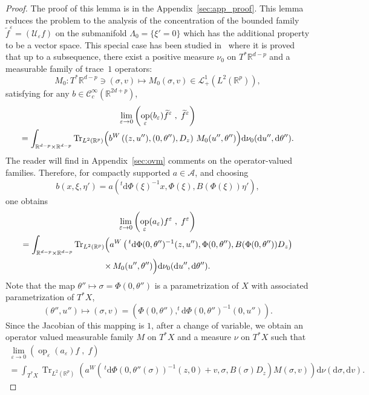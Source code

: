 \documentclass[AHL,Unicode,longabstracts]{cedram}
\DeclareMathOperator{\Trr}{Tr}
\DeclareMathOperator{\op}{op}
\newcommand*\R{{\mathbb R}}
\newcommand*\eps{\varepsilon}
\numberwithin{equation}{section}
\newcommand*{\dd}{\mathrm{d}}
\newcommand*{\dv}{\dd v}
\newcommand*{\du}{\dd u}
\newcommand*{\dnu}{\dd \nu}
\newcommand*{\dtheta}{\dd \theta}
\newcommand*{\dsigma}{\dd \sigma}
\newcommand*{\dPhi}{\dd \Phi} %
\begin{document}
\begin{proof}
The proof of this lemma is in the Appendix~\ref{sec:app_proof}. This lemma reduces the problem to the analysis of the concentration of the bounded family $\widetilde f^\eps =({\mathcal U}_\eps f)$ on the submanifold $\Lambda_0=\{\xi'=0\}$ which has the additional property to be a vector space. This special case has been studied in~\cite[p.~96--97, Proposition~2]{CFMProc} where it is proved that up to a subsequence, there exist a positive measure $\nu_0$ on $T^*\R^{d-p}$ and a measurable family of trace~$1$ operators:
\[
M_0:T^*\R^{d-p}\ni(\sigma,v)\longmapsto M_0(\sigma,v)\in \mathcal{L}^1_+(L^2(\R^p)),
\]
satisfying for any $b\in{\mathcal C}_c^\infty(\R^{2d+p})$,
\begin{multline*}	
 \lim_{\eps\rightarrow 0} \left(\op_\eps(b_\eps)\widetilde f^\eps\;,\;\widetilde f^\eps\right)
\\=\int_{\R^{d-p}\times\R^{d-p}} {\Trr}_{L^2(\R^p)} \Bigl(b^W\left((z,u''),(0,\theta''), D_z\right)
\, M_0(u'',\theta'')\Bigr)\dnu_0(\du'',\dtheta'').
\end{multline*}
The reader will find in Appendix~\ref{sec:ovm} comments on the operator-valued families. Therefore, for compactly supported $a\in{\mathcal A}$, and choosing
\[
b(x,\xi,\eta')= a\left(^t \dPhi (\xi)^{-1} x,\Phi(\xi),B\left(\Phi(\xi)\right)\eta'\right),
\]
one obtains
\begin{multline*}
\lim_{\eps\rightarrow 0} \left(\op_\eps(a_\eps)f^\eps\;,\;f^\eps\right)\\
=\int_{\R^{d-p}\times\R^{d-p}} {\Trr}_{L^2(\R^p)} \Bigl(a^W\left(\,^t \dPhi (0,\theta'')^{-1}(z,u''), \Phi(0,\theta''),B(\Phi(0,\theta'')) D_z\right)
\\ \times\, M_0(u'',\theta'')\Bigr)\dnu_0(\du'',\dtheta'').
\end{multline*}
Note that the map $\theta''\mapsto \sigma =\Phi(0,\theta'')$ is a parametrization of $X$ with associated parametrization of $T^*X$,
\[
(\theta'',u'')\mapsto (\sigma,v)=\left(\Phi(0,\theta''), ^t \dPhi (0,\theta'')^{-1}(0,u'')\right).
\]
Since the Jacobian of this mapping is $1$, after a change of variable, we obtain an operator valued measurable family $M$ on $T^*X$ and a measure $\nu$ on $T^*X$ such that
\begin{multline*}
 \lim_{\eps\rightarrow 0}\left(\op_\eps(a_\eps)f\;,\;f\right) \\
 = \int_{T^*X}{\Trr}_{L^2(\R^p)} \left(a^W\left(\,^t \dPhi (0,\theta''(\sigma))^{-1}(z,0) +v, \sigma,B(\sigma) D_ z\right) M(\sigma,v)\right)\dnu(\dsigma,\dv).
\end{multline*}

\end{proof}
\end{document}
